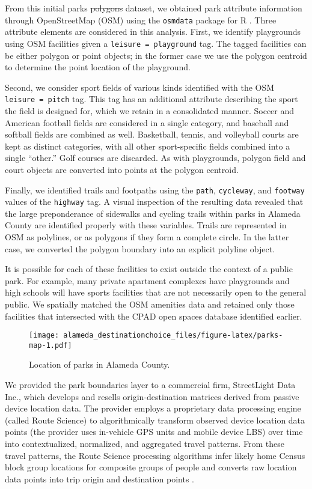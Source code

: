 \documentclass[3p, authoryear, review]{elsarticle} %
\providecommand{\DIFaddtex}[1]{{\protect\color{blue}\uwave{#1}}} %
\providecommand{\DIFdeltex}[1]{{\protect\color{red}\sout{#1}}}                      %
\providecommand{\DIFaddbegin}{} %
\providecommand{\DIFaddend}{} %
\providecommand{\DIFdelbegin}{} %
\providecommand{\DIFdelend}{} %
\providecommand{\DIFadd}[1]{\texorpdfstring{\DIFaddtex{#1}}{#1}} %
\providecommand{\DIFdel}[1]{\texorpdfstring{\DIFdeltex{#1}}{}} %
\newcommand{\DIFscaledelfig}{0.5}
\newlength{\DIFdelgraphicswidth} %
\newlength{\DIFdelgraphicsheight} %
\newcommand{\DIFaddincludegraphics}[2][]{{\color{blue}\fbox{\DIFOincludegraphics[#1]{#2}}}} %
\newcommand{\DIFdelincludegraphics}[2][]{%
\sbox{\DIFdelgraphicsbox}{\DIFOincludegraphics[#1]{#2}}%
\settoboxwidth{\DIFdelgraphicswidth}{\DIFdelgraphicsbox} %
\settoboxtotalheight{\DIFdelgraphicsheight}{\DIFdelgraphicsbox} %
\scalebox{\DIFscaledelfig}{%
\parbox[b]{\DIFdelgraphicswidth}{\usebox{\DIFdelgraphicsbox}\\[-\baselineskip] \rule{\DIFdelgraphicswidth}{0em}}\llap{\resizebox{\DIFdelgraphicswidth}{\DIFdelgraphicsheight}{%
\setlength{\unitlength}{\DIFdelgraphicswidth}%
\begin{picture}(1,1)%
\thicklines\linethickness{2pt} %
{\color[rgb]{1,0,0}\put(0,0){\framebox(1,1){}}}%
{\color[rgb]{1,0,0}\put(0,0){\line( 1,1){1}}}%
{\color[rgb]{1,0,0}\put(0,1){\line(1,-1){1}}}%
\end{picture}%
}\hspace*{3pt}}} %
} %
\DeclareRobustCommand{\DIFaddbegin}{\DIFOaddbegin \let\includegraphics\DIFaddincludegraphics} %
\DeclareRobustCommand{\DIFaddend}{\DIFOaddend \let\includegraphics\DIFOincludegraphics} %
\DeclareRobustCommand{\DIFdelbegin}{\DIFOdelbegin \let\includegraphics\DIFdelincludegraphics} %
\DeclareRobustCommand{\DIFdelend}{\DIFOaddend \let\includegraphics\DIFOincludegraphics} %
\begin{document}
From this initial parks \DIFdelbegin \DIFdel{polygons }\DIFdelend \DIFaddbegin \DIFadd{polygon }\DIFaddend dataset, we obtained park attribute information
through OpenStreetMap (OSM) using the \texttt{osmdata} package for R \citep{osmdata}. Three
attribute elements are considered in this analysis. First, we identify
playgrounds using OSM facilities given a \texttt{leisure\ =\ playground} tag. The tagged
facilities can be either polygon or point objects; in the former case we use the
polygon centroid to determine the point location of the playground.

Second, we consider sport fields of various kinds identified with the OSM
\texttt{leisure\ =\ pitch} tag. This tag has an additional attribute describing the sport
the field is designed for, which we retain in a consolidated manner. Soccer and
American football fields are considered in a single category, and baseball and
softball fields are combined as well. Basketball, tennis, and volleyball courts
are kept as distinct categories, with all other sport-specific fields combined
into a single ``other.'' Golf courses are discarded. As with playgrounds, polygon
field and court objects are converted into points at the polygon centroid.

Finally, we identified trails and footpaths using the \texttt{path}, \texttt{cycleway}, and
\texttt{footway} values of the \texttt{highway} tag. A visual inspection of the resulting data
revealed that the large preponderance of sidewalks and cycling trails within
parks in Alameda County are identified properly with these variables. Trails are
represented in OSM as polylines, or as polygons if they form a complete circle.
In the latter case, we converted the polygon boundary into an explicit polyline
object.

It is possible for each of these facilities to exist outside the context of a
public park. For example, many private apartment complexes have playgrounds and
high schools will have sports facilities that are not necessarily open to the
general public. We spatially matched the OSM amenities data and retained only
those facilities that intersected with the CPAD open spaces database identified
earlier.

\begin{figure}
\centering
\texttt{[image: alameda\_destinationchoice\_files/figure-latex/parks-map-1.pdf]}
\caption{\label{fig:parks-map}Location of parks in Alameda County.}
\end{figure}

We provided the park boundaries layer to a commercial firm, StreetLight Data
Inc., which develops and resells origin-destination matrices derived from
passive device location data. The provider employs a proprietary data processing
engine (called Route Science) to algorithmically transform observed device
location data points (the provider uses in-vehicle GPS units and mobile device
LBS) over time into contextualized, normalized, and aggregated travel patterns.
From these travel patterns, the Route Science processing algorithms infer likely
home Census block group locations for composite groups of people and converts
raw location data points into trip origin and destination points \citep{Pan2006, Friedrich2010}.
\end{document}
